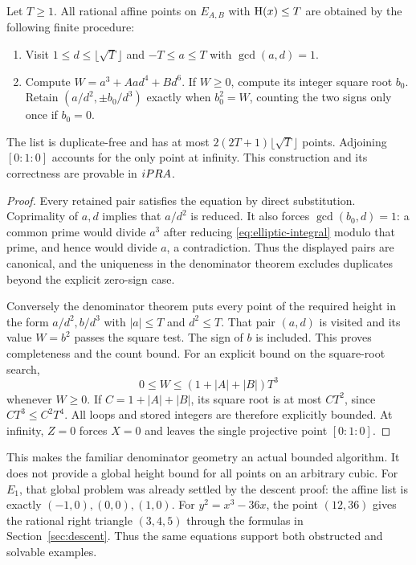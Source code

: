 \begin{theorem}
\label{thm:elliptic-search}
Let $T\ge1$. All rational affine points on $E_{A,B}$ with
$\mathrm H(x)\le T$ are obtained by the following finite procedure:
\begin{enumerate}
\item Visit $1\le d\le\lfloor\sqrt T\rfloor$ and $-T\le a\le T$
with $\gcd(a,d)=1$.
\item Compute $W=a^3+Aad^4+Bd^6$. If $W\ge0$, compute its integer
square root $b_0$. Retain $(a/d^2,\pm b_0/d^3)$ exactly when $b_0^2=W$,
counting the two signs only once if $b_0=0$.
\end{enumerate}
The list is duplicate-free and has at most
$2(2T+1)\lfloor\sqrt T\rfloor$ points. Adjoining $[0:1:0]$ accounts
for the only point at infinity. This construction and its correctness are
provable in $iPRA$.
\end{theorem}
\begin{proof}
Every retained pair satisfies the equation by direct substitution.
Coprimality of $a,d$ implies that $a/d^2$ is reduced. It also forces
$\gcd(b_0,d)=1$: a common prime would divide $a^3$ after reducing
\eqref{eq:elliptic-integral} modulo that prime, and hence would divide
$a$, a contradiction. Thus the displayed pairs are canonical, and the
uniqueness in the denominator theorem excludes duplicates beyond the
explicit zero-sign case.

Conversely the denominator theorem puts every point of the required height
in the form $a/d^2,b/d^3$ with $|a|\le T$ and $d^2\le T$. That pair
$(a,d)$ is visited and its value $W=b^2$ passes the square test. The sign
of $b$ is included. This proves completeness and the count bound.
For an explicit bound on the square-root search,
\[
      0\le W\le(1+|A|+|B|)T^3
\]
whenever $W\ge0$. If $C=1+|A|+|B|$, its square root is at most $CT^2$,
since $CT^3\le C^2T^4$. All loops and stored integers are therefore
explicitly bounded. At infinity, $Z=0$ forces $X=0$ and leaves the single
projective point $[0:1:0]$.
\end{proof}

This makes the familiar denominator geometry an actual bounded algorithm.
It does not provide a global height bound for all points on an arbitrary
cubic. For $E_1$, that global problem was already settled by the descent
proof: the affine list is exactly $(-1,0),(0,0),(1,0)$. For
$y^2=x^3-36x$, the point $(12,36)$ gives the rational right triangle
$(3,4,5)$ through the formulas in Section~\ref{sec:descent}. Thus the
same equations support both obstructed and solvable examples.

